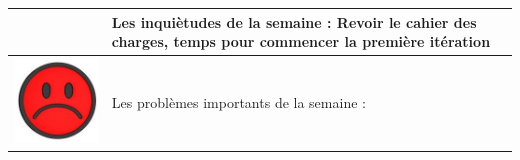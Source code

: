 \documentclass[12pt,titlepage,french]{article}
\begin{document}
\begin{tabularx}{17cm}{|p{5cm}|X|}
\begin{minipage}{.3\textwidth}
    \end{minipage}
    &
    Les inquiètudes de la semaine : Revoir le cahier des charges, temps pour commencer la première itération\\
\hline
     \begin{minipage}{.3\textwidth}
      \includegraphics[width=\linewidth]{img/smsad.jpg}
    \end{minipage}
    &
    Les problèmes importants de la semaine :\\
\hline
\end{tabularx}
\end{document}
